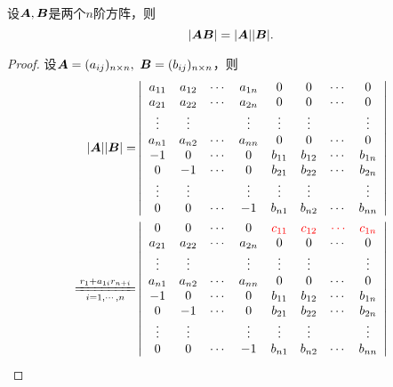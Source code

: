\begin{dingli}
  设$\boldsymbol{A},\boldsymbol{B}$是两个$n$阶方阵，则
  $$
  |\boldsymbol{A}\boldsymbol{B}| = |\boldsymbol{A}||\boldsymbol{B}|.
  $$
\end{dingli}
\begin{proof}

  设$\boldsymbol{A}=(a_{ij})_{n\times n}, ~\boldsymbol{B}=(b_{ij})_{n\times n}$，则
  $$
  \begin{aligned}
    |\MA||\MB| =& \left|
      \begin{array}{cccccccc}
        a_{11} & a_{12} & \cd &  a_{1n} & 0 & 0 & \cd & 0\\
        a_{21} & a_{22} & \cd &  a_{2n} & 0 & 0 & \cd & 0\\
        \vd   & \vd   &     & \vd    & \vd & \vd & & \vd\\
        a_{n1} & a_{n2} & \cd &  a_{nn} & 0 & 0 & \cd & 0\\
        -1    & 0     & \cd &   0    & b_{11} & b_{12} & \cd & b_{1n} \\
        0 & -1 & \cd & 0& b_{21} & b_{22} & \cd & b_{2n} \\
        \vd&\vd & & \vd &  \vd  &\vd &  & \vd   \\
        0 & 0 & \cd & -1 & b_{n1} & b_{n2} &\cd     & b_{nn}
      \end{array}
    \right|\\
    \xlongequal[i=1,\cd,n]{r_1+a_{1i}r_{n+i}}&
    \left|
      \begin{array}{cccccccc}
        0     & 0     & \cd &  0     & \red{c_{11}} & \red{c_{12}} & \red{\cd} & \red{c_{1n}}\\
        a_{21} & a_{22} & \cd &  a_{2n} & 0 & 0 & \cd & 0\\
        \vd   & \vd   &     & \vd    & \vd & \vd & & \vd\\
        a_{n1} & a_{n2} & \cd &  a_{nn} & 0 & 0 & \cd & 0\\
        -1    & 0     & \cd &   0    & b_{11} & b_{12} & \cd & b_{1n} \\
        0 & -1 & \cd & 0& b_{21} & b_{22} & \cd & b_{2n} \\
        \vd&\vd & & \vd &  \vd  &\vd &  & \vd   \\
        0 & 0 & \cd & -1 & b_{n1} & b_{n2} &\cd     & b_{nn}
      \end{array}
    \right|
  \end{aligned}
  $$
  
  

  
  

\end{proof}
